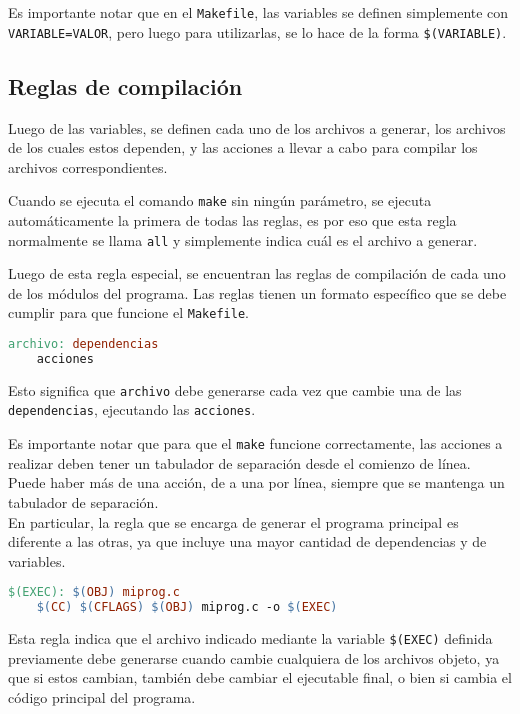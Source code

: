Es importante notar que en el \verb!Makefile!, las variables se definen
simplemente con \lstinline!VARIABLE=VALOR!, pero luego para utilizarlas, se lo
hace de la forma \lstinline!$(VARIABLE)!.

\subsection{Reglas de compilación}

Luego de las variables, se definen cada uno de los archivos a generar, los
archivos de los cuales estos dependen, y las acciones a llevar a cabo para
compilar los archivos correspondientes.

Cuando se ejecuta el comando \verb!make! sin ningún parámetro, se ejecuta
automáticamente la primera de todas las reglas, es por eso que esta regla
normalmente se llama \lstinline!all! y simplemente indica cuál es el archivo a
generar.

Luego de esta regla especial, se encuentran las reglas de compilación de cada
uno de los módulos del programa.  Las reglas tienen un formato específico que
se debe cumplir para que funcione el \verb!Makefile!.

\begin{lstlisting}[language=make, numbers=none]
archivo: dependencias
	acciones
\end{lstlisting}

Esto significa que \lstinline!archivo! debe generarse cada vez que
cambie una de las \lstinline!dependencias!, ejecutando las
\lstinline!acciones!.

Es importante notar que para que el \verb!make! funcione correctamente, las
acciones a realizar deben tener un tabulador de separación desde el comienzo
de línea.  Puede haber más de una acción, de a una por línea, siempre que se
mantenga un tabulador de separación. \\

En particular, la regla que se encarga de generar el programa principal es
diferente a las otras, ya que incluye una mayor cantidad de dependencias y de
variables.

\begin{lstlisting}[language=make, numbers=none]
$(EXEC): $(OBJ) miprog.c
	$(CC) $(CFLAGS) $(OBJ) miprog.c -o $(EXEC)
\end{lstlisting}

Esta regla indica que el archivo indicado mediante la variable
\lstinline!$(EXEC)! definida previamente debe generarse cuando cambie cualquiera
de los archivos objeto, ya que si estos cambian, también debe cambiar el
ejecutable final, o bien si cambia el código principal del programa. \\

